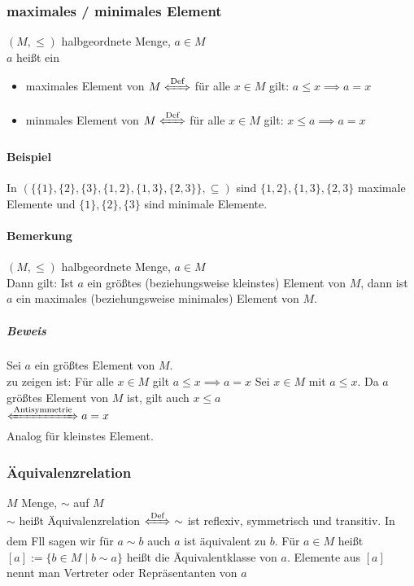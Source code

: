 \documentclass[a4paper]{scrartcl}
\theoremstyle{definition}
\theoremstyle{plain}
\theoremstyle{plain}
\theoremstyle{remark}
\theoremstyle{remark}
\theoremstyle{remark}
\theoremstyle{remark}
\theoremstyle{remark}
\begin{document}
\subsubsection{maximales / minimales Element}
\label{sec-2-5-5}
$(M,\leq)$ halbgeordnete Menge, $a\in M$ \\
    $a$ heißt ein
\begin{itemize}
\item maximales Element von $M \xLeftrightarrow{\text{Def}}$ für alle $x\in M$ gilt: $a\leq x \implies a = x$
\item minmales Element von $M \xLeftrightarrow{\text{Def}}$ für alle $x\in M$ gilt: $x\leq a \implies a = x$
\end{itemize}
\paragraph{Beispiel}
\label{sec-2-5-5-1}
In $(\{\{1\},\{2\},\{3\},\{1,2\},\{1,3\},\{2,3\}\}, \subseteq)$ sind $\{1,2\},\{1,3\},\{2,3\}$ maximale Elemente und $\{1\},\{2\},\{3\}$ sind minimale Elemente.
\paragraph{Bemerkung}
\label{sec-2-5-5-2}
$(M,\leq)$ halbgeordnete Menge, $a\in M$ \\
     Dann gilt: Ist $a$ ein größtes (beziehungsweise kleinstes) Element von $M$, dann ist $a$ ein maximales (beziehungsweise minimales) Element von $M$.
\subparagraph{Beweis}
\label{sec-2-5-5-2-1}
Sei $a$ ein größtes Element von $M$. \\
      zu zeigen ist: Für alle $x\in M$ gilt $a\leq x \implies a = x$
Sei $x\in M$ mit $a\leq x$. Da $a$ größtes Element von $M$ ist, gilt auch $x\leq a$ \\
      $\xLeftrightarrow{\text{Antisymmetrie}} a = x$ \\
      Analog für kleinstes Element.
\subsubsection{Äquivalenzrelation}
\label{sec-2-5-6}
$M$ Menge, $\sim$ auf $M$ \\
    $\sim$ heißt Äquivalenzrelation $\xLeftrightarrow{\text{Def}}~\sim$ ist reflexiv, symmetrisch und transitiv.
In dem Fll sagen wir für $a\sim b$ auch $a$ ist äquivalent zu $b$. Für $a\in M$ heißt $[a]:=\{b\in M \mid b\sim a\}$ heißt die Äquivalentklasse von $a$.
Elemente aus $[a]$ nennt man Vertreter oder Repräsentanten von $a$
\end{document}
